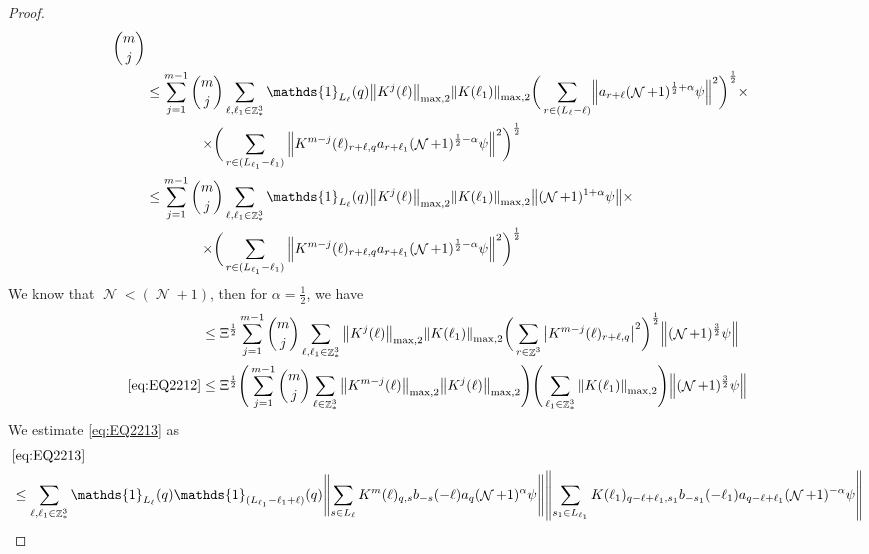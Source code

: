 \documentclass[sn-mathphys, Numbered ,a4paper]{sn-jnl}%
\DeclareMathOperator{\Z}{\mathbb{Z}}
\DeclareMathOperator{\NN}{\mathcal{N}}
\newcommand{\half}{\frac{1}{2}}
\newcommand{\normmaxii}[1]{\norm{#1}_{\mathrm{max,2}}}
\theoremstyle{plain}
\theoremstyle{definition}
\theoremstyle{remark}
\theoremstyle{plain}
\theoremstyle{definition}
\theoremstyle{remark}
\begin{document}
\begin{proof}
\begin{alignat}{2}
\begin{aligned}[t] {{m}\choose j}
 	\end{aligned} \nonumber\\   
 	&\leq \sum\limits_{j=1}^{m-1} \begin{aligned}[t]{{m}\choose j} &\sum\limits_{\ell,\ell_1 \in \Z^3_*} \mathds{1}_{L_{\ell}}(q) \normmaxii{K^j(\ell)} \normmaxii{K(\ell_1)} 
 		\bigg( \sum\limits_{r\in (L_{\ell}-\ell)}\!  \norm{ a_{r+\ell} (\NN+1)^{\half+\alpha}\psi}^2\bigg)^\half \times \nonumber\\ \times 
 		\bigg( &\sum\limits_{r\in (L_{\ell_1}-\ell_1) }\norm{ K^{m-j}(\ell)_{r+\ell,q}   a_{r+\ell_1} (\NN+1)^{\half-\alpha}\psi }^2\bigg)^\half
 	\end{aligned} \nonumber\\
 	&\leq \sum\limits_{j=1}^{m-1} \begin{aligned}[t]{{m}\choose j} &\sum\limits_{\ell,\ell_1 \in \Z^3_*} \mathds{1}_{L_{\ell}}(q) \normmaxii{K^j(\ell)} \normmaxii{K(\ell_1)}  
 		\norm{ (\NN+1)^{1+\alpha}\psi} \times \nonumber\\ \times 
 		\bigg( &\sum\limits_{r\in  (L_{\ell_1}-\ell_1) }  \norm{ K^{m-j}(\ell)_{r+\ell,q} a_{r+\ell_1} (\NN+1)^{\half-\alpha}\psi }^2\bigg)^\half \end{aligned} \nonumber\\
 \end{alignat}
 We know that $\NN<(\NN+1)$, then for $\alpha = \half$, we have
 \begin{alignat}{2}
 	&\leq \Xi^\half\sum\limits_{j=1}^{m-1} {{m}\choose j} \sum\limits_{\ell, \ell_1\in \Z^3_*} \normmaxii{K^j(\ell)} \normmaxii{K(\ell_1)} \bigg(\sum\limits_{r\in \Z^3}  \abs{ K^{m-j}(\ell)_{r+\ell,q} }^2\bigg)^\half  \norm{(\NN+1)^\frac{3}{2} \psi}  \nonumber\\
 	\eqref{eq:EQ2212}&\leq \Xi^\half \Bigg(\sum\limits_{j=1}^{m-1} {{m}\choose j} \sum\limits_{\ell \in \Z^3_*} \norm{K^{m-j}(\ell)}_{ \mathrm{max,2} } \norm{K^{j}(\ell)}_{\mathrm{max,2}}\Bigg) \Bigg(\sum\limits_{ \ell_1\in \Z^3_*}\norm{  K(\ell_1)}_{\mathrm{max,2}}\Bigg)  \norm{(\NN+1)^\frac{3}{2} \psi} \label{eq:estEQ2212}
 \end{alignat}
 We estimate \eqref{eq:EQ2213} as
\begin{alignat}{2}
	&\eqref{eq:EQ2213}\nonumber\\
	&\leq\sum\limits_{\ell, \ell_1\in \Z^3_*}  \mathds{1}_{L_{\ell}}(q) \mathds{1}_{(L_{\ell_1}-\ell_1+\ell)}(q) \norm{ \sum\limits_{s\in L_{\ell}} K^m(\ell)_{q,s} b_{-s}(-\ell) a_{q}(\NN+1)^{\alpha}\psi}\norm{ \sum\limits_{s_1 \in L_{\ell_1}} K(\ell_1)_{q-\ell+\ell_1,s_1} b_{-s_1}(-\ell_1)a_{q-\ell+\ell_1} (\NN+1)^{-\alpha} \psi }\nonumber\\

\end{alignat}
\end{proof}
\end{document}
